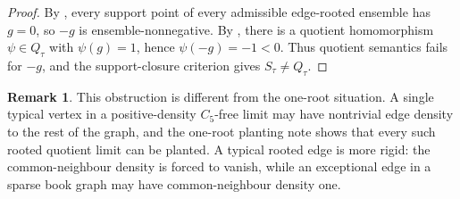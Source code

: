 \documentclass[11pt]{article}
\theoremstyle{definition}
\newtheorem{remark}[theorem]{Remark}
\begin{document}
\begin{proof}
By , every support point of every admissible edge-rooted
ensemble has $g=0$, so $-g$ is ensemble-nonnegative.  By
, there is a quotient homomorphism
$\psi\in Q_\tau$ with $\psi(g)=1$, hence $\psi(-g)=-1<0$.  Thus quotient
semantics fails for $-g$, and the support-closure criterion gives
$S_\tau\ne Q_\tau$.
\end{proof}

\begin{remark}
This obstruction is different from the one-root situation.  A single typical
vertex in a positive-density $C_5$-free limit may have nontrivial edge density
to the rest of the graph, and the one-root planting note shows that every such
rooted quotient limit can be planted.  A typical rooted edge is more rigid:
the common-neighbour density is forced to vanish, while an exceptional edge in
a sparse book graph may have common-neighbour density one.
\end{remark}
\end{document}
